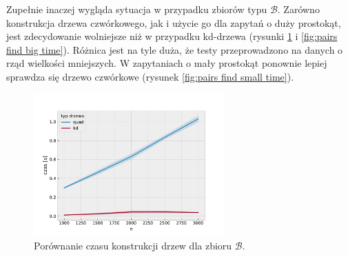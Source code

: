 \documentclass[12pt]{scrartcl}
\newcommand{\sB}{\mathcal B}
\begin{document}
Zupełnie inaczej wygląda sytuacja w przypadku zbiorów typu $\sB$. Zarówno konstrukcja drzewa czwórkowego, jak i użycie go dla zapytań o duży prostokąt, jest zdecydowanie wolniejsze niż w przypadku kd-drzewa (rysunki \ref{fig:pairs construction time} i \ref{fig:pairs find big time}). Różnica jest na tyle duża, że testy przeprowadzono na danych o rząd wielkości mniejszych. W zapytaniach o mały prostokąt ponownie lepiej sprawdza się drzewo czwórkowe (rysunek \ref{fig:pairs find small time}).

\begin{figure}[H]
    \centering
    \includegraphics[width=0.65\textwidth]{imgs/pairs_construction_time}
    \caption{Porównanie czasu konstrukcji drzew dla zbioru $\sB$.}
    \label{fig:pairs construction time}
\end{figure}
\end{document}
